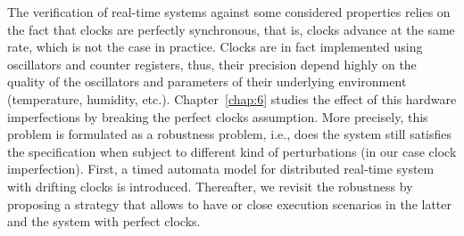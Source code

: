 The verification of real-time systems against some considered properties relies on the fact
that clocks are perfectly synchronous, that is, clocks advance at the same rate, which is not the
case in practice. Clocks are in fact implemented using oscillators and counter registers, thus,
their precision depend highly on the quality of the oscillators and parameters of their 
underlying environment (temperature, humidity, etc.). Chapter~\ref{chap:6} studies the 
effect of this hardware imperfections by breaking the perfect clocks assumption.
More precisely, this problem is formulated as a robustness problem, i.e., does the system
still satisfies the specification when subject to different kind of perturbations (in our case
clock imperfection). First, a timed automata model for distributed real-time system with 
drifting clocks is introduced. Thereafter, we revisit the robustness by proposing a strategy
that allows to have  or close execution scenarios in the latter and the system with 
perfect clocks.

